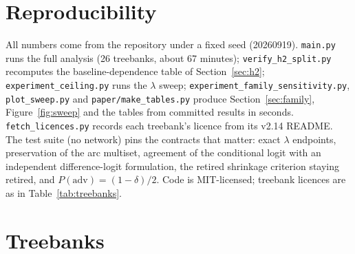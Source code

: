 \documentclass[11pt]{article}
\begin{document}
\section*{Reproducibility}

{\sloppy
All numbers come from the repository \citep{nawara2026dlm} under a fixed seed (20260919). \texttt{main.py} runs the full analysis (26 treebanks, about 67 minutes); \texttt{verify\_h2\_split.py} recomputes the baseline-dependence table of Section~\ref{sec:h2}; \texttt{experiment\_ceiling.py} runs the $\lambda$ sweep; \texttt{experiment\_family\_sensitivity.py}, \texttt{plot\_sweep.py} and \texttt{paper/make\_tables.py} produce Section~\ref{sec:family}, Figure~\ref{fig:sweep} and the tables from committed results in seconds. \texttt{fetch\_licences.py} records each treebank's licence from its v2.14 README. The test suite (no network) pins the contracts that matter: exact $\lambda$ endpoints, preservation of the arc multiset, agreement of the conditional logit with an independent difference-logit formulation, the retired shrinkage criterion staying retired, and $P(\text{adv})=(1-\delta)/2$. Code is MIT-licensed; treebank licences are as in Table~\ref{tab:treebanks}.\par}




\appendix
\section{Treebanks}

\begin{table}[h]
\centering\small
\caption{The 26 analysed treebanks (UD v2.14, training splits): family, projective sentences analysed after the 3--100 token filter, share of non-projective sentences excluded, and licence as stated in the treebank's README at tag r2.14 (\texttt{results/treebank\_licences.csv}). hu\_szeged, ta\_ttb and wo\_wtb were configured but fell below the 1,500-sentence floor.}
\label{tab:treebanks}

\end{table}
\end{document}
